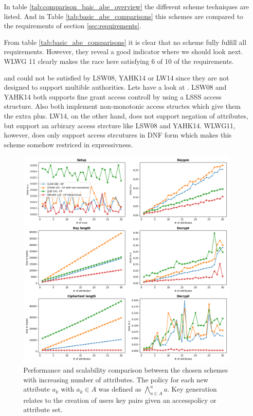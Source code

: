 In table \ref{tab:comparison_baic_abe_overview} the different scheme techniques are listed.  And in Table \ref{tab:basic_abe_comparisons} this schemes are compared to the requirements of section \ref{sec:requirements}. 

From table \ref{tab:basic_abe_comparisons} it is clear that no scheme fully fulfill all requirements. However, they reveal a good indicator where we should look next. WLWG 11 clearly makes the race here satisfying 6 of 10 of the requirements. 

 and  could not be sutisfied by LSW08, YAHK14 or LW14 since they are not designed to support multible authorities. 
Lets have a look at . LSW08 and YAHK14 both supports fine grant access controll by using a LSSS access structure. Also both implement non-monotonic access structes which give them the extra plus. LW14, on the other hand, does not support negation of attributes, but support an arbirary access strcture like LSW08 and YAHK14. WLWG11, however, does only support access strcutures in DNF form which makes this scheme somehow restriced in expressivness. 

\begin{figure}[!ht]
\centering
    \includegraphics[width=1\linewidth]{img/basic_abe_comparisons.png}
    \caption{Performance and scalability comparison between the chosen schemes with increasing number of attributes. The policy for each new attribute $a_k$ with $a_k \in A$ was defined as $\bigwedge\limits_{a \in A}^a a$. Key generation relates to the creation of users key pairs given an accesspolicy or attribute set.}
    \label{fig:basic_abe_comparison}
\end{figure}

